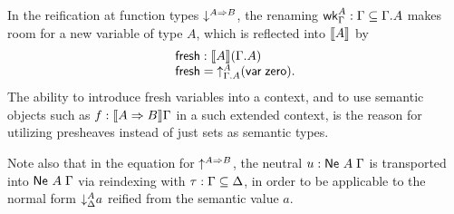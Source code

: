 \documentclass[a4paper,USenglish,cleveref, autoref]{lipics-v2019}
\begin{document}
In the reification at function types
$\down{A \To B}$,
the renaming $\twk^A_\Gamma : \Gamma \sublist \cext \Gamma A$
makes room
for a new variable of type $A$, which is reflected into $\den A$ by
\[
\begin{array}{lcl@{\qquad}lcl}
  \tfresh : \den A (\cext \Gamma A) \\
  \tfresh = \up[\cext \Gamma A] A (\tvar\;\tzero)
  . \\
\end{array}
\]
The ability to introduce fresh variables into a context, and to use
semantic objects such as $f : \den{A \To B}\Gamma$ in a such extended
context, is the reason for utilizing presheaves instead of just sets
as semantic types.

Note also that in the equation for $\up{A \To B}$,
the neutral $u : \Ne A \Gamma$ is
transported into $\Ne A \Gamma$ via reindexing with
$\tau : \Gamma \sublist \Delta$, in order to be applicable to the normal form
$\down[\Delta]A a$
reified from the semantic value $a$.
\end{document}
